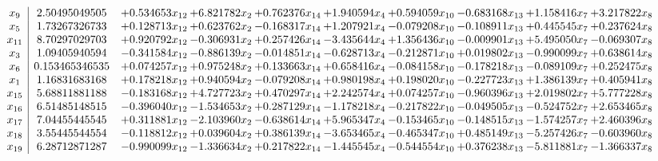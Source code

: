 \documentclass[10pt]{article}
\begin{document}
 \[\begin{array}{c| c c@{\hskip 2pt} c@{\hskip 2pt} c@{\hskip 2pt} c@{\hskip 2pt} c@{\hskip 2pt} c@{\hskip 2pt} c@{\hskip 2pt} c@{\hskip 2pt} }
 x_{9}   &  2.50495049505 & + 0.534653 x_{12} & + 6.821782 x_{2} & + 0.762376 x_{14} & + 1.940594 x_{4} & + 0.594059 x_{10} & -0.683168 x_{13} & + 1.158416 x_{7} & + 3.217822 x_{8}\\
 x_{5}   &  1.73267326733 & + 0.128713 x_{12} & + 0.623762 x_{2} & -0.168317 x_{14} & + 1.207921 x_{4} & -0.079208 x_{10} & -0.108911 x_{13} & + 0.445545 x_{7} & + 0.237624 x_{8}\\
 x_{11}   &  8.70297029703 & + 0.920792 x_{12} & -0.306931 x_{2} & + 0.257426 x_{14} & -3.435644 x_{4} & + 1.356436 x_{10} & -0.009901 x_{13} & + 5.495050 x_{7} & -0.069307 x_{8}\\
 x_{3}   &  1.09405940594 & -0.341584 x_{12} & -0.886139 x_{2} & -0.014851 x_{14} & -0.628713 x_{4} & -0.212871 x_{10} & + 0.019802 x_{13} & -0.990099 x_{7} & + 0.638614 x_{8}\\
 x_{6}   &  0.153465346535 & + 0.074257 x_{12} & + 0.975248 x_{2} & + 0.133663 x_{14} & + 0.658416 x_{4} & -0.084158 x_{10} & -0.178218 x_{13} & -0.089109 x_{7} & + 0.252475 x_{8}\\
 x_{1}   &  1.16831683168 & + 0.178218 x_{12} & + 0.940594 x_{2} & -0.079208 x_{14} & + 0.980198 x_{4} & + 0.198020 x_{10} & -0.227723 x_{13} & + 1.386139 x_{7} & + 0.405941 x_{8}\\
 x_{15}   &  5.68811881188 & -0.183168 x_{12} & + 4.727723 x_{2} & + 0.470297 x_{14} & + 2.242574 x_{4} & + 0.074257 x_{10} & -0.960396 x_{13} & + 2.019802 x_{7} & + 5.777228 x_{8}\\
 x_{16}   &  6.51485148515 & -0.396040 x_{12} & -1.534653 x_{2} & + 0.287129 x_{14} & -1.178218 x_{4} & -0.217822 x_{10} & -0.049505 x_{13} & -0.524752 x_{7} & + 2.653465 x_{8}\\
 x_{17}   &  7.04455445545 & + 0.311881 x_{12} & -2.103960 x_{2} & -0.638614 x_{14} & + 5.965347 x_{4} & -0.153465 x_{10} & -0.148515 x_{13} & -1.574257 x_{7} & + 2.460396 x_{8}\\
 x_{18}   &  3.55445544554 & -0.118812 x_{12} & + 0.039604 x_{2} & + 0.386139 x_{14} & -3.653465 x_{4} & -0.465347 x_{10} & + 0.485149 x_{13} & -5.257426 x_{7} & -0.603960 x_{8}\\
 x_{19}   &  6.28712871287 & -0.990099 x_{12} & -1.336634 x_{2} & + 0.217822 x_{14} & -1.445545 x_{4} & -0.544554 x_{10} & + 0.376238 x_{13} & -5.811881 x_{7} & -1.366337 x_{8}\\

\end{array}\]
\end{document}
